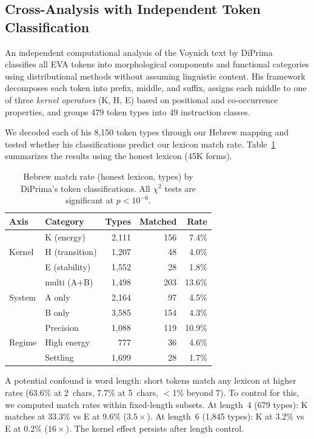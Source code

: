 \documentclass[11pt,a4paper]{article}
\begin{document}
\subsection{Cross-Analysis with Independent Token Classification}
\label{sec:cross}

An independent computational analysis of the Voynich text by
DiPrima~\citep{DiPrima2026} classifies all EVA tokens into morphological
components and functional categories using distributional methods without
assuming linguistic content. His framework decomposes each token into
prefix, middle, and suffix, assigns each middle to one of three
\emph{kernel operators} (K, H, E) based on positional and co-occurrence
properties, and groups 479 token types into 49 instruction classes.

We decoded each of his 8,150 token types through our Hebrew mapping and
tested whether his classifications predict our lexicon match rate.
Table~\ref{tab:cross} summarizes the results using the honest lexicon
(45K forms).

\begin{table}[h]
\centering
\caption{Hebrew match rate (honest lexicon, types) by DiPrima's token
classifications. All $\chi^2$ tests are significant at $p < 10^{-6}$.}
\label{tab:cross}
\begin{tabular}{llrrr}
\toprule
Axis & Category & Types & Matched & Rate \\
\midrule
\multirow{3}{*}{Kernel} & K (energy) & 2,111 & 156 & 7.4\% \\
  & H (transition) & 1,207 & 48 & 4.0\% \\
  & E (stability) & 1,552 & 28 & 1.8\% \\
\midrule
\multirow{3}{*}{System} & multi (A$+$B) & 1,498 & 203 & 13.6\% \\
  & A only & 2,164 & 97 & 4.5\% \\
  & B only & 3,585 & 154 & 4.3\% \\
\midrule
\multirow{3}{*}{Regime} & Precision & 1,088 & 119 & 10.9\% \\
  & High energy & 777 & 36 & 4.6\% \\
  & Settling & 1,699 & 28 & 1.7\% \\
\bottomrule
\end{tabular}
\end{table}

A potential confound is word length: short tokens match any lexicon at
higher rates (63.6\% at 2~chars, 7.7\% at 5~chars, $<$1\% beyond 7).
To control for this, we computed match rates within fixed-length subsets.
At length~4 (679 types): K matches at 33.3\% vs E at 9.6\% ($3.5\times$).
At length~6 (1,845 types): K at 3.2\% vs E at 0.2\% ($16\times$).
The kernel effect persists after length control.
\end{document}
